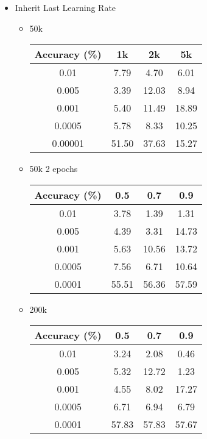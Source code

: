 \begin{itemize}
\begin{itemize}
	\end{itemize}
	\item Inherit Last Learning Rate
	\begin{itemize}
		\item 50k 
		\begin{table}[H]
			\centering
			\begin{tabular}{cccc}
				\hline
				Accuracy (\%) & 1k   & 2k   & 5k      \\ \hline
				0.01          & 7.79  & 4.70  & 6.01 \\ \hline
				0.005       & 3.39 & 12.03 & 8.94 \\ \hline
				0.001        & 5.40 & 11.49 & 18.89 \\ \hline
				0.0005          & 5.78  & 8.33  & 10.25 \\ \hline
				0.00001        & 51.50 & 37.63 & 15.27 \\ \hline
			\end{tabular}
		\end{table}	
		\item 50k 2 epochs
\begin{table}[H]
	\centering
	\begin{tabular}{cccc}
		Accuracy (\%) & 0.5   & 0.7   & 0.9   \\ \hline
		0.01          & 3.78  & 1.39  & 1.31  \\ \hline
		0.005         & 4.39  & 3.31  & 14.73 \\ \hline
		0.001         & 5.63  & 10.56 & 13.72 \\ \hline
		0.0005        & 7.56  & 6.71  & 10.64 \\ \hline
		0.0001        & 55.51 & 56.36 & 57.59 \\ \hline
	\end{tabular}
\end{table}	
		\item 200k
\begin{table}[H]
	\centering
	\begin{tabular}{cccc}
		Accuracy (\%) & 0.5   & 0.7   & 0.9   \\ \hline
		0.01          & 3.24  & 2.08  & 0.46  \\ \hline
		0.005         & 5.32  & 12.72 & 1.23  \\ \hline
		0.001         & 4.55  & 8.02  & 17.27 \\ \hline
		0.0005        & 6.71  & 6.94  & 6.79  \\ \hline
		0.0001        & 57.83 & 57.83 & 57.67 \\ \hline
	\end{tabular}
\end{table}			
			
	\end{itemize}
\end{itemize}

